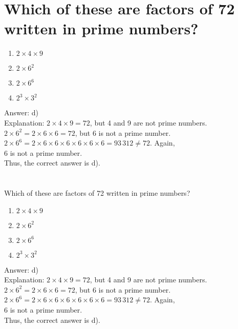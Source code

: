 \documentclass[letterpaper, 12pt]{article}
\begin{document}
\section{Which of these are factors of 72 written in prime numbers?}

	\begin{enumerate}
		\item $2 \times 4 \times 9$
		\item $2 \times 6^{2}$
		\item $2 \times 6^{6}$
		\item $2^{3} \times 3^{2}$
	\end{enumerate}

Answer: d)\\

Explanation:
$2 \times 4 \times 9 = 72$, but 4 and 9 are not prime numbers.\\
$2 \times 6^{2} = 2 \times 6 \times 6 = 72$, but 6 is not a prime number.\\
$2 \times 6^{6} = 2 \times 6 \times 6 \times 6 \times 6 \times 6
\times 6 = 93\,312 \neq72$.  Again,\\ 6 is not a prime number.\\
Thus, the correct answer is d).\\

\section{}
Which of these are factors of 72 written in prime numbers?
	\begin{enumerate}
		\item $2 \times 4 \times 9$
		\item $2 \times 6^{2}$
		\item $2 \times 6^{6}$
		\item $2^{3} \times 3^{2}$
	\end{enumerate}

Answer: d)\\

Explanation:
$2 \times 4 \times 9 = 72$, but 4 and 9 are not prime numbers.\\
$2 \times 6^{2} = 2 \times 6 \times 6 = 72$, but 6 is not a prime number.\\
$2 \times 6^{6} = 2 \times 6 \times 6 \times 6 \times 6 \times 6
\times 6 = 93\,312 \neq72$.  Again,\\ 6 is not a prime number.\\
Thus, the correct answer is d).\\
\end{document}
